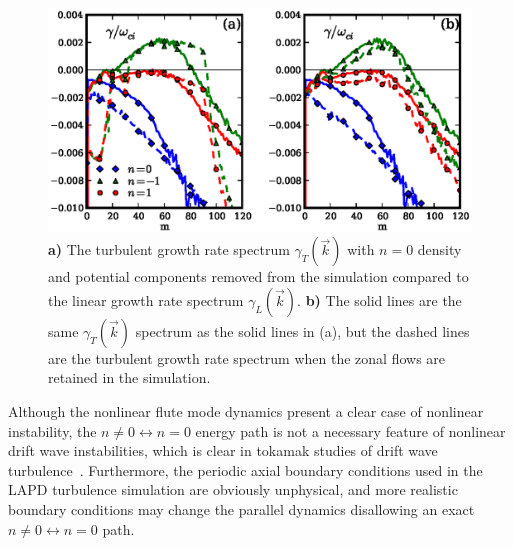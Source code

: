 \documentclass[showpacs,preprintnumbers,amsmath,amssymb,superscriptaddress,aip]{revtex4-1}
\begin{document}
\begin{figure}[!htbp]
\includegraphics[]{no_n0_growthrates}
\hfil
\caption{\textbf{a)} The turbulent growth rate spectrum $\gamma_T(\vec{k})$ with $n=0$ density and potential components removed from the 
simulation compared to the linear growth rate spectrum $\gamma_L(\vec{k})$.
\textbf{b)} The solid lines are the same $\gamma_T(\vec{k})$ spectrum as the solid lines in (a), but the dashed lines are the turbulent growth rate spectrum when the zonal flows are retained
in the simulation.}
\label{gamma_no_n0_figs}
\end{figure}


Although the nonlinear flute mode dynamics present a clear case of nonlinear instability, the $n \ne 0 \leftrightarrow n=0$ energy path is not a necessary feature of nonlinear drift wave
instabilities, which is clear in tokamak studies of drift wave turbulence~\cite{zeiler1996,zeiler1997,scott2002,scott2003,scott2005}. Furthermore, the periodic axial boundary conditions
used in the LAPD turbulence simulation are obviously unphysical, and more realistic boundary conditions may change the parallel dynamics disallowing an exact $n \ne 0 \leftrightarrow n=0$ path.
\end{document}
